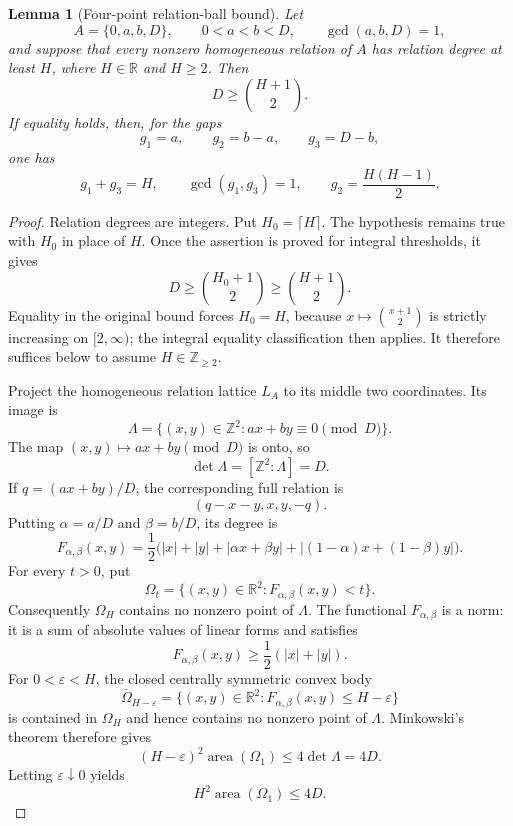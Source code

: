 \documentclass[11pt,reqno]{amsart}
\newtheorem{lemma}[theorem]{Lemma}
\theoremstyle{definition}
\theoremstyle{remark}
\newcommand{\Z}{\mathbb Z}
\begin{document}
\begin{lemma}[Four-point relation-ball bound]
\label{lem:fourpoint-relation-ball}
Let
\[
 A=\{0,a,b,D\},\qquad 0<a<b<D,\qquad \gcd(a,b,D)=1,
\]
and suppose that every nonzero homogeneous relation of $A$ has relation
degree at least $H$, where $H\in\mathbb R$ and $H\geq2$.  Then
\[
 D\geq \binom{H+1}{2}.
\]
If equality holds, then, for the gaps
\[
 g_1=a,\qquad g_2=b-a,\qquad g_3=D-b,
\]
one has
\begin{equation}\label{eq:fourpointcriticalgaps}
 g_1+g_3=H,\qquad
 \gcd(g_1,g_3)=1,\qquad
 g_2=\frac{H(H-1)}2.
\end{equation}
\end{lemma}

\begin{proof}
Relation degrees are integers.  Put $H_0=\lceil H\rceil$.  The hypothesis
remains true with $H_0$ in place of $H$.  Once the assertion is proved for
integral thresholds, it gives
\[
 D\geq\binom{H_0+1}{2}\geq\binom{H+1}{2}.
\]
Equality in the original bound forces $H_0=H$, because
$x\mapsto\binom{x+1}{2}$ is strictly increasing on $[2,\infty)$; the
integral equality classification then applies.  It therefore suffices below
to assume $H\in\mathbb Z_{\geq2}$.

Project the homogeneous relation lattice $L_A$ to its middle two
coordinates.  Its image is
\[
 \Lambda=\{(x,y)\in\Z^2:ax+by\equiv0\pmod D\}.
\]
The map $(x,y)\mapsto ax+by\pmod D$ is onto, so
\begin{equation}\label{eq:fourpointdeterminant}
 \det\Lambda=[\Z^2:\Lambda]=D.
\end{equation}
If $q=(ax+by)/D$, the corresponding full relation is
\[
 (q-x-y,x,y,-q).
\]
Putting $\alpha=a/D$ and $\beta=b/D$, its degree is
\[
 F_{\alpha,\beta}(x,y)
 =\frac12\bigl(
 |x|+|y|+|\alpha x+\beta y|
 +|(1-\alpha)x+(1-\beta)y|\bigr).
\]
For every $t>0$, put
\[
 \Omega_t=\{(x,y)\in\mathbb R^2:F_{\alpha,\beta}(x,y)<t\}.
\]
Consequently $\Omega_H$ contains no nonzero point of $\Lambda$.
The functional $F_{\alpha,\beta}$ is a norm: it is a sum of absolute values
of linear forms and satisfies
\[
 F_{\alpha,\beta}(x,y)\geq\frac12(|x|+|y|).
\]
For $0<\varepsilon<H$, the closed centrally symmetric convex body
\[
 \overline\Omega_{H-\varepsilon}
 =\{(x,y)\in\mathbb R^2:
       F_{\alpha,\beta}(x,y)\leq H-\varepsilon\}
\]
is contained in $\Omega_H$ and hence contains no nonzero point of
$\Lambda$.  Minkowski's theorem therefore gives
\[
 (H-\varepsilon)^2\operatorname{area}(\Omega_1)
 \leq4\det\Lambda=4D.
\]
Letting $\varepsilon\downarrow0$ yields
\begin{equation}\label{eq:fourpointMinkowski}
 H^2\operatorname{area}(\Omega_1)\leq4D.
\end{equation}


\end{proof}
\end{document}
